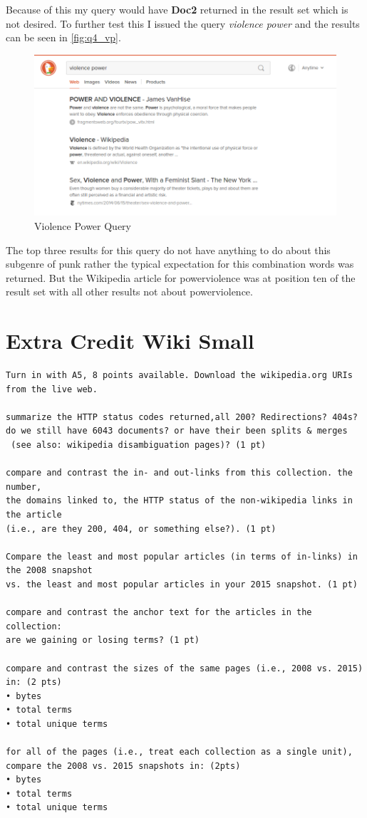 \documentclass[11pt]{article}
\begin{document}
Because of this my query would have \textbf{Doc2} returned in the result set which is not desired. To further test this I issued the query \textit{violence power} and the results can be seen in \autoref{fig:q4_vp}.
\begin{figure}[H]
\centering
\includegraphics[scale=0.8]{duckduckgo_vp.png}
\caption{Violence  Power Query}
\label{fig:q4_vp}
\end{figure}
The top three results for this query do not have anything to do about this subgenre of punk rather the typical expectation for this combination words was returned. But the Wikipedia article for powerviolence was at position ten of the result set with all other results not about powerviolence.
\clearpage
\section{Extra Credit Wiki Small} \label{q5}
\begin{verbatim}
Turn in with A5, 8 points available. Download the wikipedia.org URIs from the live web.

summarize the HTTP status codes returned,all 200? Redirections? 404s? 
do we still have 6043 documents? or have their been splits & merges 
 (see also: wikipedia disambiguation pages)? (1 pt)

compare and contrast the in- and out-links from this collection. the number, 
the domains linked to, the HTTP status of the non-wikipedia links in the article 
(i.e., are they 200, 404, or something else?). (1 pt)

Compare the least and most popular articles (in terms of in-links) in the 2008 snapshot 
vs. the least and most popular articles in your 2015 snapshot. (1 pt)

compare and contrast the anchor text for the articles in the collection: 
are we gaining or losing terms? (1 pt)

compare and contrast the sizes of the same pages (i.e., 2008 vs. 2015) in: (2 pts)
• bytes
• total terms
• total unique terms

for all of the pages (i.e., treat each collection as a single unit), 
compare the 2008 vs. 2015 snapshots in: (2pts)
• bytes
• total terms
• total unique terms
\end{verbatim}
\end{document}

